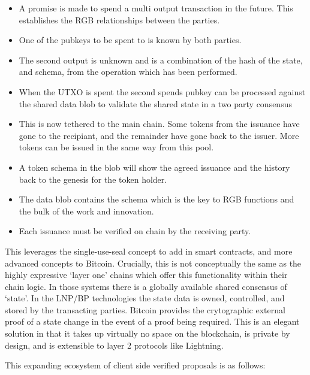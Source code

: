 \begin{itemize}
\item A promise is made to spend a multi output transaction in the future. This establishes the RGB relationships between the parties.
\item One of the pubkeys to be spent to is known by both parties.
\item The second output is unknown and is a combination of the hash of the state, and schema, from the operation which has been performed.
\item When the UTXO is spent the second spends pubkey can be processed against the shared data blob to validate the shared state in a two party consensus
\item This is now tethered to the main chain. Some tokens from the issuance have gone to the recipiant, and the remainder have gone back to the issuer. More tokens can be issued in the same way from this pool. 
\item A token schema in the blob will show the agreed issuance and the history back to the genesis for the token holder. 
\item The data blob contains the schema which is the key to RGB functions and the bulk of the work and innovation. 
\item Each issuance must be verified on chain by the receiving party. 
\end{itemize} 
This leverages the single-use-seal concept to add in smart contracts, and more advanced concepts to Bitcoin. Crucially, this is not conceptually the same as the highly expressive `layer one' chains which offer this functionality within their chain logic. In those systems there is a globally available shared consensus of `state'. In the LNP/BP technologies the state data is owned, controlled, and stored by the transacting parties. Bitcoin provides the crytographic external proof of a state change in the event of a proof being required. This is an elegant solution in that it takes up virtually no space on the blockchain, is private by design, and is extensible to layer 2 protocols like Lightning.\par
This expanding ecosystem of client side verified proposals is as follows:
